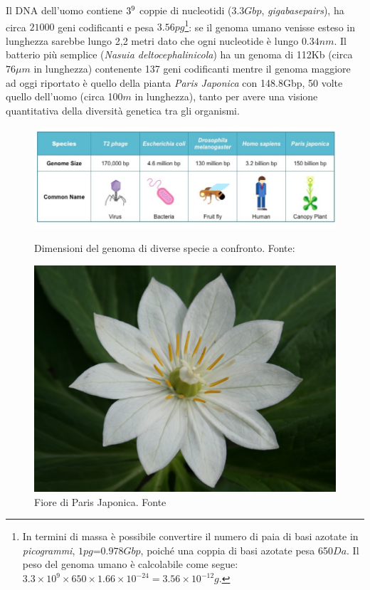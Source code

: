 \par Il DNA dell'uomo contiene $3\time10^{9}$ coppie di nucleotidi ($3.3Gbp$, \textit{gigabasepairs}), ha circa $21000$ geni codificanti e pesa $3.56pg$\footnote{In termini di massa è possibile convertire il numero di paia di basi azotate in \textit{picogrammi}, $1pg$=$0.978Gbp$, poiché una coppia di basi azotate pesa 650$Da$. Il peso del genoma umano è calcolabile come segue: $3.3\times10^{9}\times650\times1.66\times10^{-24}=3.56\times10^{-12}g$.}: se il genoma umano venisse esteso in lunghezza sarebbe lungo 2,2 metri dato che ogni nucleotide è lungo $0.34nm$. Il batterio più semplice (\textit{Nasuia deltocephalinicola}) ha un genoma di 112Kb\supercite{nasuiaWiki} (circa $76\mu m$ in lunghezza) contenente 137 geni codificanti mentre il genoma maggiore ad oggi riportato è quello della pianta \textit{Paris Japonica} con 148.8Gbp\supercite{hidalgo2017there}, 50 volte quello dell'uomo (circa 100$m$ in lunghezza), tanto per avere una visione quantitativa della diversità genetica tra gli organismi.

\begin{figure}[!htb]
	\centering
	\includegraphics[scale=0.35]{images/genome-size-table_med.jpeg}
	\caption{Dimensioni del genoma di diverse specie a confronto. Fonte: \cite{genomeSizeBioNinja}}
	\label{fig:genome-size}
	\endminipage\hfill
	\centering
	\includegraphics[scale=0.1]{images/Paris-japonica.jpg}
	\caption{Fiore di Paris Japonica. Fonte \cite{Pariswiki}}
	\label{fig:paris-japonica}
	\endminipage\hfill
\end{figure}


